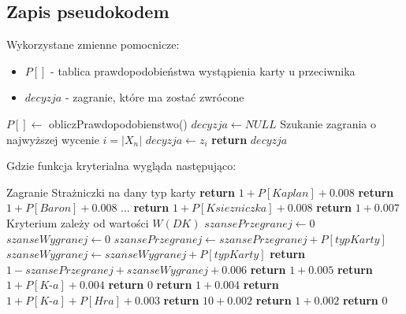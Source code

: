 \subsection{Zapis pseudokodem}
Wykorzystane zmienne pomocnicze:
\begin{itemize}
	\item $P[]$ - tablica prawdopodobieństwa wystąpienia karty u przeciwnika
	\item $decyzja$ - zagranie, które ma zostać zwrócone
\end{itemize}
\begin{algorithmic}[1]
		\State $P[] \gets$ obliczPrawdopodobienstwo()
		\State $ decyzja \gets NULL$ \Comment Szukanie zagrania o najwyższej wycenie
		 \Comment $i=|X_n|$
					\State $decyzja \gets z_i$
				\EndIf
		\EndFor		
		\State \textbf{return} $decyzja$
	\EndFunction
\end{algorithmic}

Gdzie funkcja kryterialna wygląda następująco:
\begin{algorithmic}[1]
			 \Comment Zagranie Strażniczki na dany typ karty
				\State \textbf{return} $ 1 + P[Kaplan] + 0.008 $
			\EndCase
				\State \textbf{return} $ 1 + P[Baron]  + 0.008 $
			\EndCase
			\State ...
				\State \textbf{return} $ 1 + P[Ksiezniczka]  + 0.008 $
			\EndCase
				\State \textbf{return} $ 1 + 0.007 $
			\EndCase
				\Comment Kryterium zależy od wartości $W(DK)$
				\State $ szansePrzegranej \gets 0$ 
				\State $ szanseWygranej \gets 0$ 
						\State $szansePrzegranej \gets szansePrzegranej + P[typKarty]$ 
						\State $szanseWygranej \gets szanseWygranej + P[typKarty]$ 
					\EndIf
				\EndFor
				\State \textbf{return} $ 1 - szansePrzegranej + szanseWygranej + 0.006 $
			\EndCase
				\State \textbf{return} $ 1 + 0.005 $
			\EndCase
				\State \textbf{return} $ 1 + P[\textit{K-a}] + 0.004 $
			\EndCase
					\State \textbf{return} $ 0 $
				\Else
					\State \textbf{return} $ 1 + 0.004 $
				\EndIf
			\EndCase
				\State \textbf{return} $ 1 + P[\textit{K-a}] + P[Hra] + 0.003 $
			\EndCase
				\State \textbf{return} $ 10 + 0.002 $
			\EndCase
				\State \textbf{return} $ 1 + 0.002 $
			\EndCase
				\State \textbf{return} $ 0 $
			\EndCase
		\EndSwitch
	\EndFunction
\end{algorithmic}


